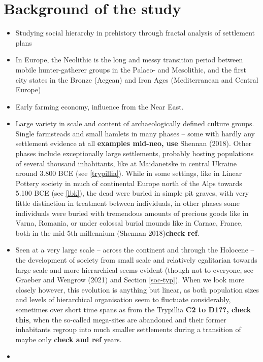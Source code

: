 \documentclass[
  12pt,
  a4paper, twoside]{book}
\begin{document}
\hypertarget{background-of-the-study}{%
\section{Background of the study}\label{background-of-the-study}}

\begin{itemize}
\item
  Studying social hierarchy in prehistory through fractal analysis of settlement plans
\item
  In Europe, the Neolithic is the long and messy transition period between mobile hunter-gatherer groups in the Palaeo- and Mesolithic, and the first city states in the Bronze (Aegean) and Iron Ages (Mediterranean and Central Europe)
\item
  Early farming economy, influence from the Near East.
\item
  Large variety in scale and content of archaeologically defined culture groups. Single farmsteads and small hamlets in many phases -- some with hardly any settlement evidence at all \textbf{examples mid-neo, use} Shennan (2018). Other phases include exceptionally large settlements, probably hosting populations of several thousand inhabitants, like at Maidanetske in central Ukraine around 3.800 BCE (see \ref{trypillia}). While in some settings, like in Linear Pottery society in much of continental Europe north of the Alps towards 5.100 BCE (see \ref{lbk}), the dead were buried in simple pit graves, with very little distinction in treatment between individuals, in other phases some individuals were buried with tremendous amounts of precious goods like in Varna, Romania, or under colossal burial mounds like in Carnac, France, both in the mid-5th millennium (Shennan 2018)\textbf{check ref}.
\item
  Seen at a very large scale -- across the continent and through the Holocene -- the development of society from small scale and relatively egalitarian towards large scale and more hierarchical seems evident (though not to everyone, see Graeber and Wengrow (2021) and Section \ref{soc-typ}). When we look more closely however, this evolution is anything but linear, as both population sizes and levels of hierarchical organisation seem to fluctuate considerably, sometimes over short time spans as from the Trypillia \textbf{C2 to D1??, check this}, when the so-called mega-sites are abandoned and their former inhabitants regroup into much smaller settlements during a transition of maybe only \textbf{check and ref} years.
\item

\end{itemize}
\end{document}
